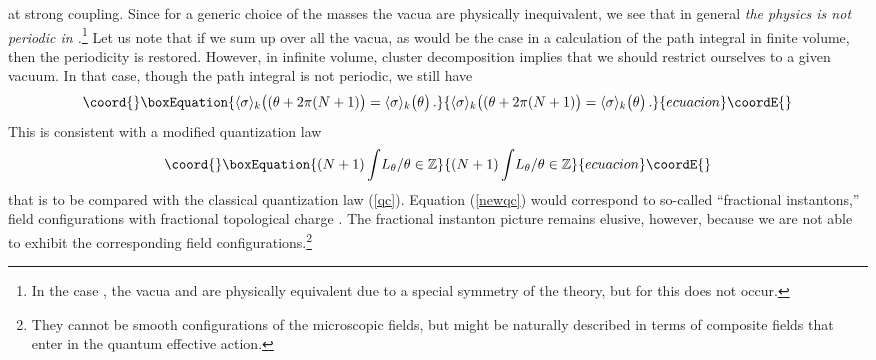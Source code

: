 \documentclass[a4paper,12pt]{article}
\begin{document}
\myHighlight{$\theta\rightarrow\theta +2\pi$}\coordHE{} at strong coupling. Since for a 
generic choice of the masses \coordHE{} the \coordHE{} vacua are physically 
inequivalent, we see that in general {\it the physics is not 
\myHighlight{$2\pi$}\coordHE{} periodic in \myHighlight{$\theta$}\coordHE{}.}\footnote{In the case \coordHE{}, 
the vacua \myHighlight{$|1\rangle$}\coordHE{} and \myHighlight{$|2\rangle$}\coordHE{} are physically equivalent due 
to a special \coordHE{} symmetry of the theory, but for \coordHE{} this does not occur.} Let us note that if we sum up over all the 
vacua, as would be the case in a calculation of the path integral in 
finite volume, then the \myHighlight{$2\pi$}\coordHE{} periodicity is restored. However, in 
infinite volume, cluster decomposition implies that
we should restrict ourselves to a given vacuum. In that case, though
the path integral is not \myHighlight{$2\pi$}\coordHE{} periodic, we still have 
%
\begin{equation}\coord{}\boxEquation{
\label{newperiod}
\langle\sigma\rangle_{k}\bigl((\theta + 2\pi (N+1)\bigr) = 
\langle\sigma\rangle_{k}\bigl( \theta\bigr)\, .
}{
\langle\sigma\rangle_{k}\bigl((\theta + 2\pi (N+1)\bigr) = 
\langle\sigma\rangle_{k}\bigl( \theta\bigr)\, .
}{ecuacion}\coordE{}\end{equation}
%
This is consistent with a modified quantization law
%
\begin{equation}\coord{}\boxEquation{
\label{newqc}
(N+1) \int\! L_{\theta}/\theta \in {\mathbb Z}
}{
(N+1) \int\! L_{\theta}/\theta \in {\mathbb Z}
}{ecuacion}\coordE{}\end{equation}
%
that is to be compared with the classical quantization law 
(\ref{qc}). Equation (\ref{newqc}) 
would correspond to so-called ``fractional instantons,'' 
field configurations with fractional topological charge \coordHE{}. 
The fractional instanton picture remains elusive, however, because we 
are not able to exhibit the corresponding field 
configurations.\footnote{They cannot be smooth configurations of the
microscopic fields, but might be naturally described in terms of 
composite fields that enter in the quantum effective action.} 
\end{document}
